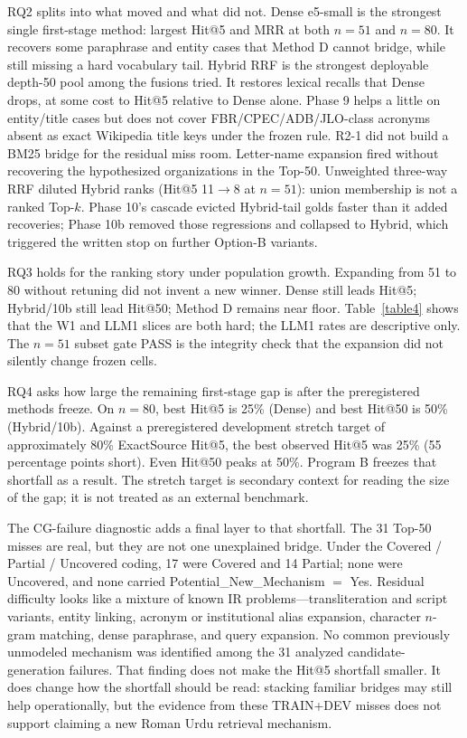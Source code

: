 \documentclass[10pt,letterpaper]{article}
\begin{document}
RQ2 splits into what moved and what did not. Dense e5-small is the strongest single first-stage method: largest Hit@5 and MRR at both $n = 51$ and $n = 80$. It recovers some paraphrase and entity cases that Method D cannot bridge, while still missing a hard vocabulary tail. Hybrid RRF is the strongest deployable depth-50 pool among the fusions tried. It restores lexical recalls that Dense drops, at some cost to Hit@5 relative to Dense alone. Phase 9 helps a little on entity/title cases but does not cover FBR/CPEC/ADB/JLO-class acronyms absent as exact Wikipedia title keys under the frozen rule. R2-1 did not build a BM25 bridge for the residual miss room. Letter-name expansion fired without recovering the hypothesized organizations in the Top-50. Unweighted three-way RRF diluted Hybrid ranks (Hit@5 11$\to$8 at $n = 51$): union membership is not a ranked Top-$k$. Phase 10's cascade evicted Hybrid-tail golds faster than it added recoveries; Phase 10b removed those regressions and collapsed to Hybrid, which triggered the written stop on further Option-B variants.

RQ3 holds for the ranking story under population growth. Expanding from 51 to 80 without retuning did not invent a new winner. Dense still leads Hit@5; Hybrid/10b still lead Hit@50; Method D remains near floor. Table~\ref{table4} shows that the W1 and LLM1 slices are both hard; the LLM1 rates are descriptive only. The $n = 51$ subset gate PASS is the integrity check that the expansion did not silently change frozen cells.

RQ4 asks how large the remaining first-stage gap is after the preregistered methods freeze. On $n = 80$, best Hit@5 is 25\% (Dense) and best Hit@50 is 50\% (Hybrid/10b). Against a preregistered development stretch target of approximately 80\% ExactSource Hit@5, the best observed Hit@5 was 25\% (55 percentage points short). Even Hit@50 peaks at 50\%. Program B freezes that shortfall as a result. The stretch target is secondary context for reading the size of the gap; it is not treated as an external benchmark.

The CG-failure diagnostic adds a final layer to that shortfall. The 31 Top-50 misses are real, but they are not one unexplained bridge. Under the Covered / Partial / Uncovered coding, 17 were Covered and 14 Partial; none were Uncovered, and none carried Potential\_New\_Mechanism $=$ Yes. Residual difficulty looks like a mixture of known IR problems---transliteration and script variants, entity linking, acronym or institutional alias expansion, character $n$-gram matching, dense paraphrase, and query expansion. No common previously unmodeled mechanism was identified among the 31 analyzed candidate-generation failures. That finding does not make the Hit@5 shortfall smaller. It does change how the shortfall should be read: stacking familiar bridges may still help operationally, but the evidence from these TRAIN+DEV misses does not support claiming a new Roman Urdu retrieval mechanism.
\end{document}
